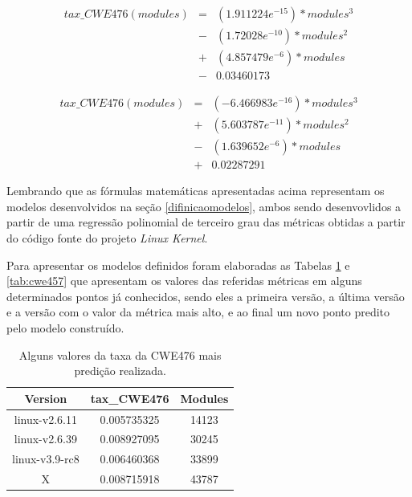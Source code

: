 \begin{align*}
 tax\_CWE476(modules) &=& (1.911224e^{-15}) * modules^{3} \\
                      &-& (1.72028e^{-10}) * modules^{2} \\
                      &+& (4.857479e^{-6}) * modules \\
                      &-& 0.03460173
\end{align*}

\begin{align*}
 tax\_CWE476(modules) &=& (-6.466983e^{-16}) * modules^{3} \\
                      &+& (5.603787e^{-11}) * modules^{2} \\
                      &-& (1.639652e^{-6}) * modules \\
                      &+& 0.02287291
\end{align*}

Lembrando que as fórmulas matemáticas apresentadas acima representam os modelos
desenvolvidos na seção \ref{difinicaomodelos}, ambos sendo desenvovlidos a
partir de uma regressão polinomial de terceiro grau das métricas obtidas a
partir do código fonte do projeto \textit{Linux Kernel}.

Para apresentar os modelos definidos foram elaboradas as Tabelas
\ref{tab:cwe476} e \ref{tab:cwe457} que apresentam os valores das referidas
métricas em alguns determinados pontos já conhecidos, sendo eles a primeira
versão, a última versão e a versão com o valor da métrica mais alto, e ao final
um novo ponto predito pelo modelo construído.

\begin{table}[h]
\centering
\begin{tabular}{ccc}
\hline
\rowcolor[HTML]{EFEFEF} 
{Version}  & {tax\_CWE476} & {Modules} \\ \hline
linux-v2.6.11  & 0.005735325       & 14123         \\ \hline
linux-v2.6.39  & 0.008927095       & 30245         \\ \hline
linux-v3.9-rc8 & 0.006460368       & 33899         \\ \hline
X              & 0.008715918       & 43787         \\ \hline
\end{tabular}
\caption{Alguns valores da taxa da CWE476 mais predição realizada.}
\label{tab:cwe476}
\end{table}

